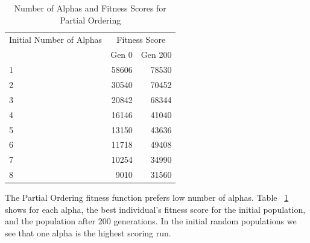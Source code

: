 \documentclass[3p,times,procedia]{elsarticle}
\begin{document}

\begin{table}[h]
\caption{Number of Alphas and Fitness Scores for Partial Ordering}
\label{NumberOfAlphas}
\begin{tabular}{lrr}
\hline
Initial Number of Alphas & \multicolumn{2}{c}{Fitness Score}     \\
                 & Gen 0            & Gen 200            \\ \hline
{ 1 } & { 58606 } & { 78530 } \\ 
{ 2 } & { 30540 } & { 70452 } \\ 
{ 3 } & { 20842 } & { 68344 } \\ 
{ 4 } & { 16146 } & { 41040 } \\ 
{ 5 } & { 13150 } & { 43636 } \\ 
{ 6 } & { 11718 } & { 49408 } \\ 
{ 7 } & { 10254 } & { 34990 } \\ 
{ 8 } & {  9010 } & { 31560 } \\ 
\hline
\end{tabular}
\end{table}

The Partial Ordering fitness function prefers low number of alphas. Table ~\ref{NumberOfAlphas} shows for each alpha, the best individual's fitness score for the initial population, and the population after 200 generations. In the initial random populations we see that one alpha is the highest scoring run.
\end{document}
